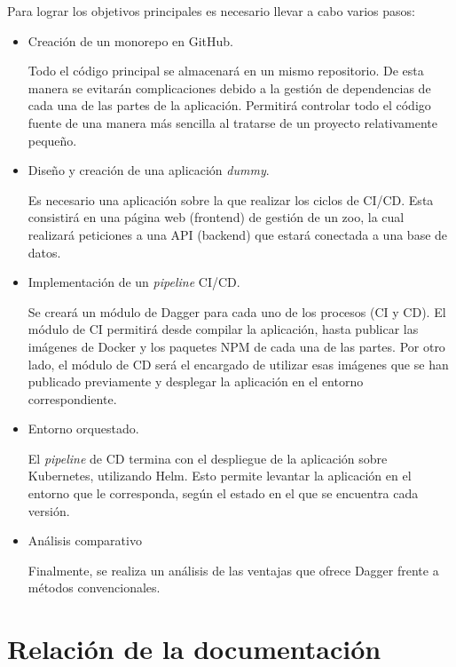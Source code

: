 Para lograr los objetivos principales es necesario llevar a cabo varios pasos:
\begin{itemize}
  \item Creación de un monorepo\cite{monorepo} en GitHub.

    Todo el código principal se almacenará en un mismo repositorio. De esta manera se evitarán complicaciones debido a la gestión de dependencias de cada una de las partes de la aplicación. Permitirá controlar todo el código fuente de una manera más sencilla al tratarse de un proyecto relativamente pequeño.
  \item Diseño y creación de una aplicación \textit{dummy}.

    Es necesario una aplicación sobre la que realizar los ciclos de CI/CD. Esta consistirá en una página web (frontend) de gestión de un zoo, la cual realizará peticiones a una API (backend) que estará conectada a una base de datos.
  \item Implementación de un \textit{pipeline} CI/CD.

    Se creará un módulo de Dagger para cada uno de los procesos (CI y CD). El módulo de CI permitirá desde compilar la aplicación, hasta publicar las imágenes de Docker y los paquetes NPM de cada una de las partes. Por otro lado, el módulo de CD será el encargado de utilizar esas imágenes que se han publicado previamente y desplegar la aplicación en el entorno correspondiente.
  \item Entorno orquestado.

    El \textit{pipeline} de CD termina con el despliegue de la aplicación sobre Kubernetes\cite{kubernetes}, utilizando Helm\cite{helm}. Esto permite levantar la aplicación en el entorno que le corresponda, según el estado en el que se encuentra cada versión.

  \item Análisis comparativo

    Finalmente, se realiza un análisis de las ventajas que ofrece Dagger frente a métodos convencionales.
\end{itemize}

\section{Relación de la documentación}

